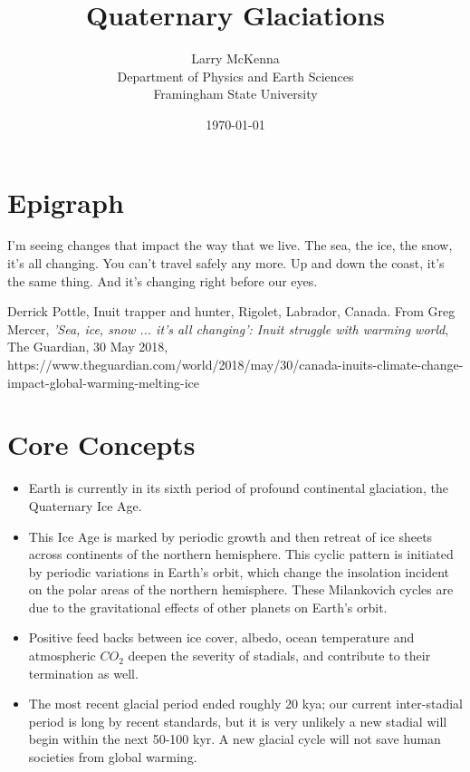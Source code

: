 \documentclass[amstex,12pt]{book}
\begin{document}
\title{Quaternary Glaciations} \label{The Ice_Ages}
\date{\today}
\author{Larry McKenna\\Department of Physics and Earth Sciences\\Framingham State University}
\maketitle
\section*{Epigraph} \label{Epigraph}
\epigraph{I’m seeing changes that impact the way that we live. The sea, the ice, the snow, it’s all changing. You can’t travel safely any more. Up and down the coast, it’s the same thing. And it’s changing right before our eyes.}{Derrick Pottle, Inuit trapper and hunter, Rigolet, Labrador, Canada. From Greg Mercer, \textit{'Sea, ice, snow ... it’s all changing': Inuit struggle with warming world}, The Guardian, 30 May 2018, https://www.theguardian.com/world/2018/may/30/canada-inuits-climate-change-impact-global-warming-melting-ice } 

\section{Core Concepts} \label{Epigraph}
\begin{itemize}
	\item	Earth is currently in its sixth period of profound continental glaciation, the Quaternary Ice Age.  
	\item This Ice Age is marked by periodic growth and then retreat of ice sheets across continents of the northern hemisphere. This cyclic pattern is initiated by periodic variations in Earth's orbit, which change the insolation incident on the polar areas of the northern hemisphere. These Milankovich cycles are due to the gravitational effects of other planets on Earth's orbit.
	\item Positive feed backs between ice cover, albedo, ocean temperature and atmospheric $CO_2$ deepen the severity of stadials, and contribute to their termination as well. 
	\item The most recent glacial period ended roughly 20 kya; our current inter-stadial period is long by recent standards, but it is very unlikely a new stadial will begin within the next 50-100 kyr. A new glacial cycle will not save human societies from global warming. 
\end{itemize}
\end{document}
